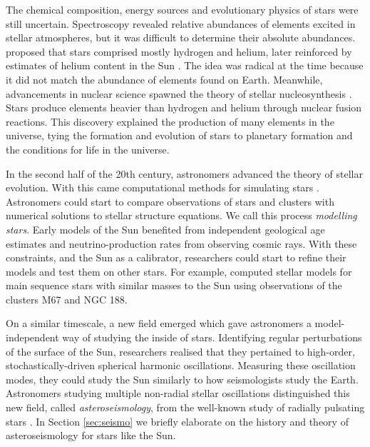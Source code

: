 The chemical composition, energy sources and evolutionary physics of stars were still uncertain. Spectroscopy revealed relative abundances of elements excited in stellar atmospheres, but it was difficult to determine their absolute abundances. \citet{Payne1925} proposed that stars comprised mostly hydrogen and helium, later reinforced by estimates of helium content in the Sun \citep[e.g.][]{Schwarzschild1946}. The idea was radical at the time because it did not match the abundance of elements found on Earth. Meanwhile, advancements in nuclear science spawned the theory of stellar nucleosynthesis \citep{Hoyle1946}. Stars produce elements heavier than hydrogen and helium through nuclear fusion reactions. This discovery explained the production of many elements in the universe, tying the formation and evolution of stars to planetary formation and the conditions for life in the universe.

In the second half of the 20th century, astronomers advanced the theory of stellar evolution. With this came computational methods for simulating stars \citep[e.g.][]{Kippenhahn.Weigert.ea1967}. Astronomers could start to compare observations of stars and clusters with numerical solutions to stellar structure equations. We call this process \emph{modelling stars}. Early models of the Sun benefited from independent geological age estimates and neutrino-production rates from observing cosmic rays. With these constraints, and the Sun as a calibrator, researchers could start to refine their models and test them on other stars. For example, \citet{Iben1967} computed stellar models for main sequence stars with similar masses to the Sun using observations of the clusters M67 and NGC 188.

On a similar timescale, a new field emerged which gave astronomers a model-independent way of studying the inside of stars. Identifying regular perturbations of the surface of the Sun, researchers realised that they pertained to high-order, stochastically-driven spherical harmonic oscillations. Measuring these oscillation modes, they could study the Sun similarly to how seismologists study the Earth. Astronomers studying multiple non-radial stellar oscillations distinguished this new field, called \emph{asteroseismology}, from the well-known study of radially pulsating stars \citep[e.g. Cepheid variables;][]{Leavitt1908}. In Section \ref{sec:seismo} we briefly elaborate on the history and theory of asteroseismology for stars like the Sun.



